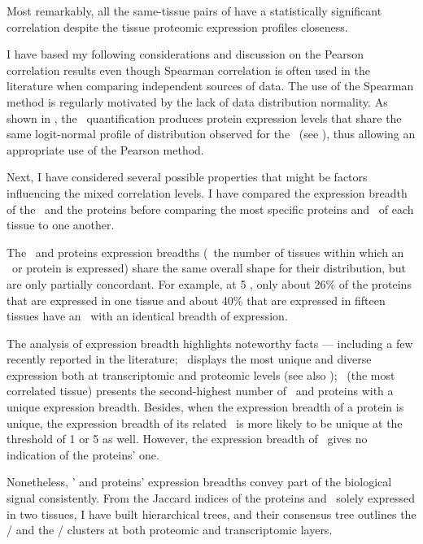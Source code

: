 Most remarkably,
all the same-tissue pairs of 
have a statistically significant correlation
despite the tissue proteomic expression profiles closeness.\mybr\

I have based my following considerations and discussion
on the Pearson correlation results
even though Spearman correlation is often used in the literature
when comparing independent sources of data.
The use of the Spearman method is regularly motivated
by the lack of data distribution normality.
As shown in ,
the \PPKM\ quantification produces protein expression levels
that share the same logit-normal profile of distribution
observed for the \mRNAs\ (see ),
thus allowing an appropriate use of the Pearson method.\mybr\

Next, I have considered several possible properties
that might be factors influencing the mixed correlation levels.
I have compared the expression breadth of the \mRNAs\ and the proteins
before comparing the most specific proteins and \mRNAs\ of each tissue
to one another.\mybr\

The \mRNAs\ and proteins expression breadths
(\ie\ the number of tissues within which an \mRNA\ or protein is expressed)
share the same overall shape for their distribution,
but are only partially concordant.
For example, at 5 \FPKM,
only about 26\% of the proteins that are expressed in one tissue
and about 40\% that are expressed in fifteen tissues have
an \mRNA\ with an identical breadth of expression.\mybr\

The analysis of expression breadth highlights noteworthy facts
--- including a few recently reported in the literature;
\testis\ displays the most unique and diverse expression
both at transcriptomic and proteomic levels
(see also \citet{Wang2019-ut,Zhang2015-yn});
\liver\ (the most correlated tissue) presents the second-highest number
of \mRNAs\ and proteins with a unique expression breadth.
Besides, when the expression breadth of a protein is unique,
the expression breadth of its related \mRNA\ is more likely to be unique
at the threshold of 1 or 5 \FPKM{} as well.
However, the expression breadth of \mRNAs\ gives no indication
of the proteins' one.\mybr\

Nonetheless, \mRNAs{}' and proteins' expression breadths convey
part of the biological signal consistently.
From the Jaccard indices of the proteins and \mRNAs\
solely expressed in two tissues,
I have built hierarchical trees,
and their consensus tree outlines
the \ovary{}/\testis{} and the \kidney{}/\liver{} clusters
at both proteomic and transcriptomic layers.\mybr\

